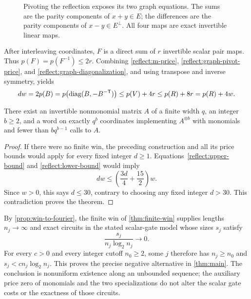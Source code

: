 \begin{figure}[ht]
\centering
{}
\caption{Pivoting the reflection exposes its two graph equations.
The sums are the parity components of $x+y\in E$; the differences
are the parity components of $x-y\in E^\perp$.
All four maps are exact invertible linear maps.}
\label{reflect:graph-figure}
\end{figure}

After interleaving coordinates, $F$ is a direct sum of $r$ invertible
scalar pair maps.  Thus $p(F)=p(F^{-1})\leq2r$.
Combining \eqref{reflect:m-price},
\eqref{reflect:graph-pivot-price}, and
\eqref{reflect:graph-diagonalization}, and using transpose and
inverse symmetry, yields
\begin{equation}
 dw=2p(B)
    =p\bigl(\operatorname{diag}(B,-B^{-\mathsf T})\bigr)
    \leq p(V)+4r
    \leq p(R)+8r
    =p(R)+4w.
 \label{reflect:lower-bound}
\end{equation}

\begin{theorem}
\label{thm:finite-win}
There exist an invertible nonmonomial matrix $A$ of a finite width
$q$, an integer $b\geq2$, and a word on exactly $q^b$ coordinates
implementing $A^{\otimes b}$ with monomials and fewer than
$bq^{b-1}$ calls to $A$.
\end{theorem}

\begin{proof}
If there were no finite win, the preceding construction and all its
price bounds would apply for every fixed integer $d\geq1$.
Equations~\eqref{reflect:upper-bound} and
\eqref{reflect:lower-bound} would imply
\[
 dw\leq\left(\frac{3d}{4}+\frac{15}{2}\right)w.
\]
Since $w>0$, this says $d\leq30$, contrary to choosing any fixed
integer $d>30$.  This contradiction proves the theorem.
\end{proof}

By \cref{prop:win-to-fourier}, the finite win of
\cref{thm:finite-win} supplies lengths $n_j\to\infty$ and exact
circuits in the stated scalar-gate model whose sizes $s_j$ satisfy
\[
 \frac{s_j}{n_j\log_2 n_j}\longrightarrow0.
\]
For every $c>0$ and every integer cutoff $n_0\geq2$, some $j$
therefore has $n_j\geq n_0$ and $s_j<c n_j\log_2 n_j$.
This proves the precise negative alternative in \cref{thm:main}.
The conclusion is nonuniform existence along an unbounded sequence;
the auxiliary price zero of monomials and the two specializations do
not alter the scalar gate costs or the exactness of those circuits.
